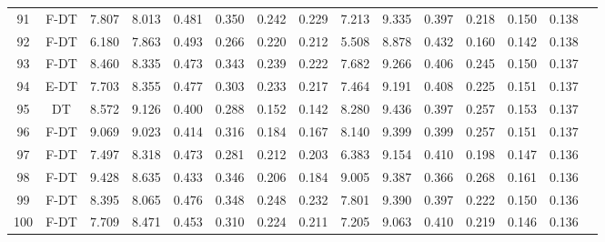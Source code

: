 \begin{longtable}{@{\hskip3pt}c@{\hskip3pt}c@{\hskip3pt}c@{\hskip3pt}c@{\hskip3pt}c@{\hskip3pt}c@{\hskip3pt}c@{\hskip3pt}c@{\hskip3pt}c@{\hskip3pt}c@{\hskip3pt}c@{\hskip3pt}c@{\hskip3pt}c@{\hskip3pt}c@{\hskip3pt}c}
         91 &           F-DT &             7.807 &       8.013 &         0.481 &       0.350 &       0.242 &        0.229 &               7.213 &       9.335 &         0.397 &       0.218 &       0.150 &        0.138 \\
         92 &           F-DT &             6.180 &       7.863 &         0.493 &       0.266 &       0.220 &        0.212 &               5.508 &       8.878 &         0.432 &       0.160 &       0.142 &        0.138 \\
         93 &           F-DT &             8.460 &       8.335 &         0.473 &       0.343 &       0.239 &        0.222 &               7.682 &       9.266 &         0.406 &       0.245 &       0.150 &        0.137 \\
         94 &           E-DT &             7.703 &       8.355 &         0.477 &       0.303 &       0.233 &        0.217 &               7.464 &       9.191 &         0.408 &       0.225 &       0.151 &        0.137 \\
         95 &             DT &             8.572 &       9.126 &         0.400 &       0.288 &       0.152 &        0.142 &               8.280 &       9.436 &         0.397 &       0.257 &       0.153 &        0.137 \\
         96 &           F-DT &             9.069 &       9.023 &         0.414 &       0.316 &       0.184 &        0.167 &               8.140 &       9.399 &         0.399 &       0.257 &       0.151 &        0.137 \\
         97 &           F-DT &             7.497 &       8.318 &         0.473 &       0.281 &       0.212 &        0.203 &               6.383 &       9.154 &         0.410 &       0.198 &       0.147 &        0.136 \\
         98 &           F-DT &             9.428 &       8.635 &         0.433 &       0.346 &       0.206 &        0.184 &               9.005 &       9.387 &         0.366 &       0.268 &       0.161 &        0.136 \\
         99 &           F-DT &             8.395 &       8.065 &         0.476 &       0.348 &       0.248 &        0.232 &               7.801 &       9.390 &         0.397 &       0.222 &       0.150 &        0.136 \\
        100 &           F-DT &             7.709 &       8.471 &         0.453 &       0.310 &       0.224 &        0.211 &               7.205 &       9.063 &         0.410 &       0.219 &       0.146 &        0.136 \\

\end{longtable}

